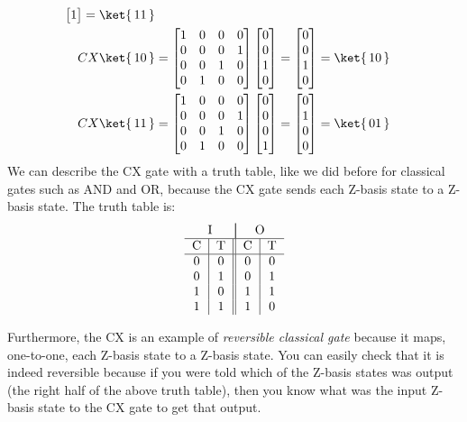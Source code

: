 \documentclass{article}
\theoremstyle{definition}
\newcommand{\kz}[1]{\ket{\,#1\,}}
\begin{document}
\begin{example}
\begin{align}
\begin{bmatrix}
			1
		\end{bmatrix} = \kz{11}\\
		CX \kz{10} &= \begin{bmatrix}
			1 & 0 & 0 & 0\\
			0 & 0 & 0 & 1\\
			0 & 0 & 1 & 0\\
			0 & 1 & 0 & 0
		\end{bmatrix} \begin{bmatrix}
			0\\
			0\\
			1\\
			0
		\end{bmatrix} = \begin{bmatrix}
			0\\
			0\\
			1\\
			0
		\end{bmatrix} = \kz{10}\\
		CX \kz{11} &= \begin{bmatrix}
			1 & 0 & 0 & 0\\
			0 & 0 & 0 & 1\\
			0 & 0 & 1 & 0\\
			0 & 1 & 0 & 0
		\end{bmatrix} \begin{bmatrix}
			0\\
			0\\
			0\\
			1
		\end{bmatrix} = \begin{bmatrix}
			0\\
			1\\
			0\\
			0
		\end{bmatrix} = \kz{01}
	\end{align}
	We can describe the CX gate with a truth table, like we did before for classical gates such as AND and OR, because the CX gate sends each Z-basis state to a Z-basis state.  The truth table is:
	\begin{equation}
		\begin{tabular}{c|c||c|c} \multicolumn{2}{c|}{I} & \multicolumn{2}{|c}{O}\\
			\hline
			C & T & C & T\\
			\hline
			0 & 0 & 0 & 0\\
			0 & 1 & 0 & 1\\
			1 & 0 & 1 & 1\\
			1 & 1 & 1 & 0
		\end{tabular}
	\end{equation}
	\begin{note}
		Furthermore, the CX is an example of \textit{reversible classical gate} because it maps, one-to-one, each Z-basis state to a Z-basis state.
		You can easily check that it is indeed reversible because if you were told which of the Z-basis states was output (the right half of the above truth table), then you know what was the input Z-basis state to the CX gate to get that output.
		

\end{note}
\end{example}
\end{document}
